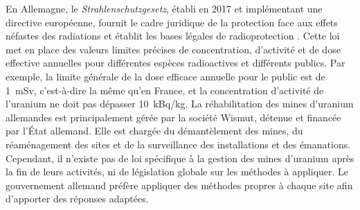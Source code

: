 \documentclass{article}
\begin{document}
En Allemagne, le \emph{Strahlenschutzgesetz}, établi en 2017 et implémentant une directive européenne, fournit le cadre juridique de la protection face aux effets néfastes des radiations et établit les bases légales de radioprotection \cite{noauthor_nuclear_nodate}.
Cette loi met en place des valeurs limites précises de concentration, d’activité et de dose effective annuelles pour différentes espèces radioactives et différents publics. Par exemple, la limite générale de la dose efficace annuelle pour le public est de 1~mSv, c'est-à-dire la même qu'en France, et la concentration d’activité de l’uranium ne doit pas dépasser 10~kBq/kg. La réhabilitation des mines d’uranium allemandes est principalement gérée par la société Wismut, détenue et financée par l'État allemand. Elle est chargée du démantèlement des mines, du réaménagement des sites et de la surveillance des installations et des émanations.
Cependant, il n’existe pas de loi spécifique à la gestion des mines d’uranium après la fin de leurs activités, ni de législation globale sur les méthodes à appliquer. Le gouvernement allemand préfère appliquer des méthodes propres à chaque site afin d’apporter des réponses adaptées.

\end{document}

